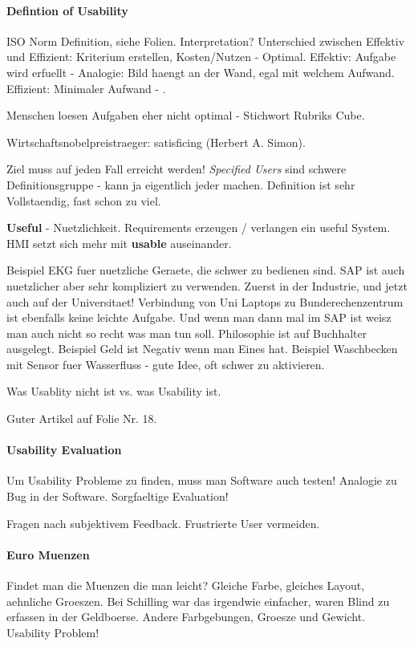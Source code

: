 \paragraph{Defintion of Usability}
ISO Norm Definition, siehe Folien. Interpretation? Unterschied zwischen Effektiv
und Effizient: Kriterium erstellen, Kosten/Nutzen - Optimal.
Effektiv: Aufgabe wird erfuellt - Analogie: Bild haengt an der Wand, egal mit welchem Aufwand.
Effizient: Minimaler Aufwand - .

Menschen loesen Aufgaben eher nicht optimal - Stichwort Rubriks Cube.

Wirtschaftsnobelpreistraeger: satisficing (Herbert A. Simon).

Ziel muss auf jeden Fall erreicht werden! \textit{Specified Users} sind schwere
Definitionsgruppe - kann ja eigentlich jeder machen.
Definition ist sehr Vollstaendig, fast schon zu viel.

\textbf{Useful} - Nuetzlichkeit. Requirements erzeugen / verlangen ein useful System.
HMI setzt sich mehr mit \textbf{usable} auseinander.

Beispiel EKG fuer nuetzliche Geraete, die schwer zu bedienen sind. 
SAP ist auch nuetzlicher aber sehr kompliziert zu verwenden. Zuerst in der Industrie,
und jetzt auch auf der Universitaet! Verbindung von Uni Laptops zu Bunderechenzentrum
ist ebenfalls keine leichte Aufgabe. Und wenn man dann mal im SAP ist weisz man 
auch nicht so recht was man tun soll. Philosophie ist auf Buchhalter ausgelegt. 
Beispiel Geld ist Negativ wenn man Eines hat.
Beispiel Waschbecken mit Sensor fuer Wasserfluss - gute Idee, oft schwer zu aktivieren.

Was Usablity nicht ist vs. was Usability ist.

Guter Artikel auf Folie Nr. 18.

\paragraph{Usability Evaluation}
Um Usability Probleme zu finden, muss man Software auch testen! Analogie zu Bug in 
der Software. Sorgfaeltige Evaluation!

Fragen nach subjektivem Feedback. Frustrierte User vermeiden.

\paragraph{Euro Muenzen}
Findet man die Muenzen die man leicht? Gleiche Farbe, gleiches Layout, aehnliche
Groeszen. Bei Schilling war das irgendwie einfacher, waren Blind zu erfassen in der 
Geldboerse. Andere Farbgebungen, Groesze und Gewicht. Usability Problem!

